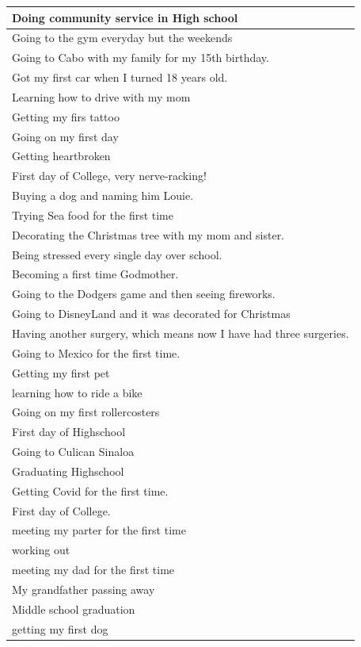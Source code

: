 \documentclass[
  .7em,
  letterpaper,
  DIV=11,
  numbers=noendperiod]{scrartcl}
\begin{document}
\begin{table}
\begin{tabular}{l}
Doing community service in High school\\
\hline
Going to the gym everyday but the weekends\\
\hline
Going to Cabo with my family for my 15th birthday.\\
\hline
Got my first car when I turned 18 years old.\\
\hline
Learning how to drive with my mom\\
\hline
Getting my firs tattoo\\
\hline
Going on my first day\\
\hline
Getting heartbroken\\
\hline
First day of College, very nerve-racking!\\
\hline
Buying a dog and naming him Louie.\\
\hline
Trying Sea food for the first time\\
\hline
Decorating the Christmas tree with my mom and sister.\\
\hline
Being stressed every single day over school.\\
\hline
Becoming a first time Godmother.\\
\hline
Going to the Dodgers game and then seeing fireworks.\\
\hline
Going to DisneyLand and it was decorated for Christmas\\
\hline
Having another surgery, which means now I have had three surgeries.\\
\hline
Going to Mexico for the first time.\\
\hline
Getting my first pet\\
\hline
learning how to ride a bike\\
\hline
Going on my first rollercosters\\
\hline
First day of Highschool\\
\hline
Going to Culican Sinaloa\\
\hline
Graduating Highschool\\
\hline
Getting Covid for the first time.\\
\hline
First day of College.\\
\hline
meeting my parter for the first time\\
\hline
working out\\
\hline
meeting my dad for the first time\\
\hline
My grandfather passing away\\
\hline
Middle school graduation\\
\hline
getting my first dog\\

\end{tabular}
\end{table}
\end{document}
